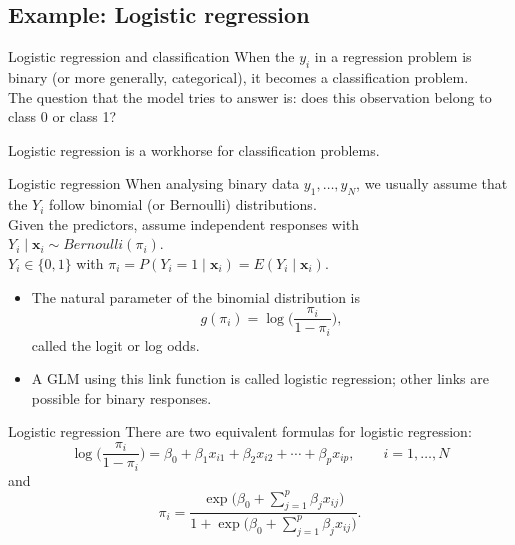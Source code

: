 \documentclass[10pt]{beamer}
\begin{document}
\subsection{Example: Logistic regression}

\begin{frame}{Logistic regression and classification}
When the $y_i$ in a regression problem is binary (or more generally, categorical), it becomes a {\color{uured}classification problem}.\\[3mm]\pause
The question that the model tries to answer is: does this observation belong to class 0 or class 1?\\[3mm]\pause

Logistic regression is a workhorse for classification problems.

\end{frame}




\begin{frame}{Logistic regression}
When analysing binary data $y_1,\ldots,y_N$, we usually assume that the $Y_i$ follow binomial (or Bernoulli) distributions.\\[3mm ]\pause
Given the predictors, assume independent responses with $Y_i\mid\mathbf{x}_i \sim Bernoulli(\pi_i)$.\\[3mm ]\pause
$Y_i \in \{0,1\}$ with $\pi_i=P(Y_i=1\mid\mathbf{x}_i)=E(Y_i\mid\mathbf{x}_i)$.\\[3mm ]\pause
\begin{itemize}
\item The natural parameter of the binomial distribution is $$g(\pi_i)=\log\Big(\frac{\pi_i}{1-\pi_i}\Big),$$
called the {\color{uured}logit} or {\color{uured}log odds}.\\[3mm ]\pause
\item A GLM using this link function is called {\color{uured}logistic regression}; other links are possible for binary responses.
\end{itemize}
\end{frame}


\begin{frame}{Logistic regression}
There are two equivalent formulas for {\color{uured}logistic regression}:
$$\log\Big(\frac{\pi_i}{1-\pi_i}\Big)=\beta_0+\beta_1 x_{i1}+\beta_2 x_{i2}+\cdots+\beta_p x_{ip},\qquad i=1,\ldots,N$$
and
$$\pi_i=\frac{\exp\Big(\beta_0+\sum_{j=1}^p\beta_jx_{ij}\Big)}{1+\exp\Big(\beta_0+\sum_{j=1}^p\beta_jx_{ij}\Big)}.$$
\end{frame}
\end{document}
